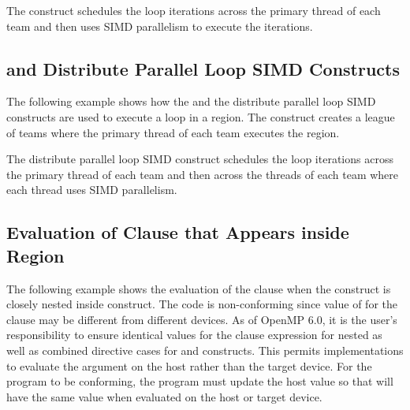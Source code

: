 The  construct schedules the loop iterations across 
the primary thread of each team and then uses SIMD parallelism to execute the iterations.



\subsection{ and Distribute Parallel Loop SIMD Constructs}
\label{subsec:teams_distribute_parallel_simd}

The following example shows how the  and the distribute 
parallel loop SIMD constructs are used to execute a loop in a  
region. The  construct creates a league of teams 
where the primary thread of each team executes the  region.

The distribute parallel loop SIMD construct schedules the loop iterations across 
the primary thread of each team and then across the threads of each team where each 
thread uses SIMD parallelism.



\subsection{Evaluation of  Clause that Appears inside  Region}
\label{subsec:target_teams_num_teams}

The following example shows the evaluation of the  clause when the  construct is closely nested inside  construct. The code is non-conforming since value of  for the clause may be different from different devices. As of OpenMP 6.0, it is the user's responsibility to ensure identical values for the clause expression for nested as well as combined directive cases for  and  constructs. This permits implementations to evaluate the  argument on the host rather than the target device. For the program to be conforming, the program must update the host value so that  will have the same value when evaluated on the host or target device.




